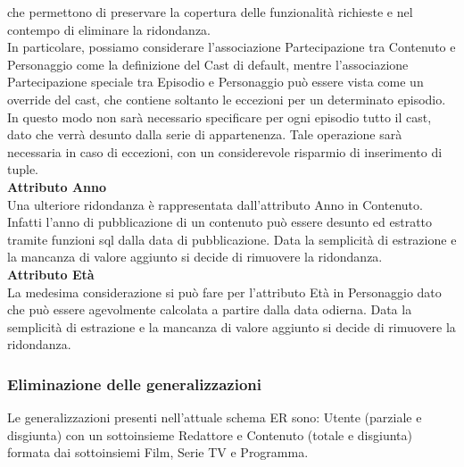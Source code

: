\documentclass[a4paper]{article}
\begin{document}
che permettono di preservare la copertura delle funzionalità richieste e nel contempo di eliminare la ridondanza. \\
In particolare, possiamo considerare l'associazione Partecipazione tra Contenuto e Personaggio come 
la definizione del Cast di default, mentre l'associazione Partecipazione speciale tra Episodio e Personaggio 
può essere vista come un override del cast, che contiene soltanto le eccezioni per un determinato episodio. \\
In questo modo non sarà necessario specificare per ogni episodio tutto il cast, dato che verrà desunto dalla serie di appartenenza.
Tale operazione sarà necessaria in caso di eccezioni, con un considerevole risparmio di inserimento di tuple. \\
\textbf{Attributo Anno}\\
Una ulteriore ridondanza è rappresentata dall'attributo Anno in Contenuto. Infatti l'anno di pubblicazione 
di un contenuto può essere desunto ed estratto tramite funzioni sql dalla data di pubblicazione.
Data la semplicità di estrazione e la mancanza di valore aggiunto si decide di rimuovere la ridondanza. \\
\textbf{Attributo Età}\\
La medesima considerazione si può fare per l'attributo Età in Personaggio dato che può essere agevolmente calcolata
a partire dalla data odierna.
Data la semplicità di estrazione e la mancanza di valore aggiunto si decide di rimuovere la ridondanza. \\

\subsubsection{Eliminazione delle generalizzazioni}
Le generalizzazioni presenti nell'attuale schema ER sono: Utente (parziale e disgiunta) con un sottoinsieme Redattore e 
Contenuto (totale e disgiunta) formata dai sottoinsiemi Film, Serie TV e Programma.\\
\end{document}
